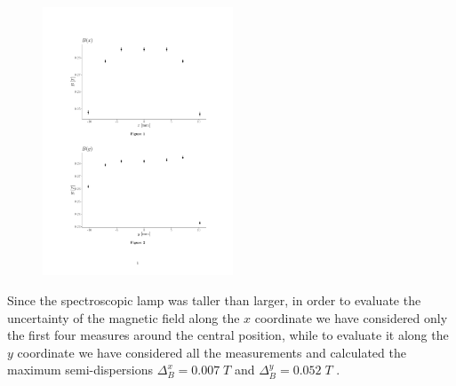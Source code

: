 \documentclass[a4paper,12pt,abstracton]{scrartcl}
\begin{document}
\begin{table}[H]
\centering
\caption{}
\label{table:disY}
\end{table}

\begin{figure}[H]
\begin{center}
\includegraphics[trim=3cm 4cm 3cm 15cm, clip,height=8cm,keepaspectratio]{plots/MagneticDishomogeneity.pdf}
\end{center}
\caption{}
\label{fig:disY}
\end{figure}

Since the spectroscopic lamp was taller than larger, in order to evaluate the uncertainty of the magnetic field along the $x$ coordinate we have considered only the first four measures around the central position, while to evaluate it along the $y$ coordinate we have considered all the measurements and calculated the maximum semi-dispersions $\Delta_B^x=0.007 \; T$ and $\Delta_B^y=0.052 \; T$ .
\end{document}
